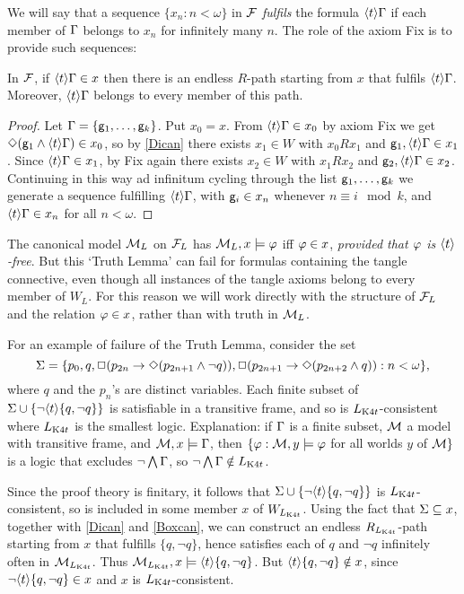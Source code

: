 We will say that a sequence $\{x_n:n<\omega\}$ in $\mathcal{F}$ \emph{fulfils} the formula $\langle t\rangle\Gamma$ if 
each member of $\Gamma$ belongs to $x_n$ for infinitely many $n$. The role of the axiom Fix is to provide such sequences:

\begin{lemma}\label{one}
In $\mathcal{F}$, if $\langle t\rangle\Gamma\in x$ then there is an endless $R$-path starting from $x$ that fulfils $\langle t\rangle\Gamma$. Moreover, $\langle t\rangle\Gamma$ belongs to every member of this path. 
\end{lemma}

\begin{proof}
Let $\Gamma=\{{\sf g}_1,\dots,{\sf g}_k\}$.
Put $x_0=x$. From $\langle t\rangle\Gamma\in x_0$ by axiom Fix 
we get $\Diamond({\sf g}_1\land\langle t\rangle\Gamma)\in x_0$, so by \eqref{Dican} there exists $x_1\in W$ with $x_0Rx_1$ and ${\sf g}_1,\langle t\rangle\Gamma\in x_1$. Since $\langle t\rangle\Gamma\in x_1$, by Fix again there exists $x_2\in W$ with $x_1Rx_2$ and ${\sf g}_2,\langle t\rangle\Gamma\in x_2$. Continuing in this way ad infinitum cycling through the list ${\sf g}_1,\dots,{\sf g}_k$ we generate a sequence fulfilling $\langle t\rangle\Gamma$, with  ${\sf g}_i\in x_n$ whenever $n\equiv i\mod k$, and  $\langle t\rangle\Gamma\in x_n$ for all $n<\omega$.
\end{proof}

The canonical model $\mathcal{M}_L$ on $\mathcal{F}_L$ has $\mathcal{M}_L,x\models \varphi$ iff $\varphi\in x$, \emph{provided that $\varphi$ is $\langle t\rangle$-free}.
But this `Truth Lemma' can fail for formulas containing the tangle connective, even though all instances of the tangle axioms belong to every member of $W_L$. For this reason we will work directly with the structure of $\mathcal{F}_L$ and the relation
 $\varphi\in x$, rather than with truth in $\mathcal{M}_L$.
 
 For an example of failure of the Truth Lemma, consider the set
 $$
 \Sigma=\{p_0,q,\Box(p_{2n}\to\Diamond(p_{2n+1}\land\neg q)),\Box(p_{2n+1}\to\Diamond(p_{2n+2}\land q)):n<\omega\},
 $$
 where $q$ and the $p_n$'s are distinct variables.
Each finite subset of 
$\Sigma\cup\{\neg\langle t\rangle\{q,\neg q\}\}$
is satisfiable in a transitive frame, and so is $L_{\mathrm{K}4t}$-consistent where $L_{\mathrm{K}4t}$ is the smallest logic. Explanation:
if $\Gamma$ is a finite subset,
$\mathcal{M}$ a model with transitive frame, and $\mathcal{M},x\models\Gamma$, then
$\{\varphi:\mathcal{M},y\models\varphi$ for all worlds $y$ of $\mathcal{M}\}$ is a logic that excludes $\neg\bigwedge\Gamma$, so $\neg\bigwedge\Gamma\notin L_{\mathrm{K}4t}$.

Since the proof theory is finitary, it follows that $\Sigma\cup\{\neg\langle t\rangle\{q,\neg q\}\}$ is $L_{\mathrm{K}4t}$-consistent, so is included in some member $x$ of  $W_{L_{\mathrm{K}4t}}$. Using the fact that $\Sigma\subseteq x$, together with \eqref{Dican} and \eqref{Boxcan}, we can construct an endless $R_{L_{\mathrm{K}4t}}$-path starting from $x$ that fulfills $\{q,\neg q\}$, hence satisfies each of $q$ and $\neg q$ infinitely often in 
$\mathcal{M}_{L_{\mathrm{K}4t}}$. Thus $\mathcal{M}_{L_{\mathrm{K}4t}},x\models\langle t\rangle\{q,\neg q\}$. But $\langle t\rangle\{q,\neg q\}\notin x$, since  $\neg\langle t\rangle\{q,\neg q\}\in x$ and $x$ is $L_{\mathrm{K}4t}$-consistent.




